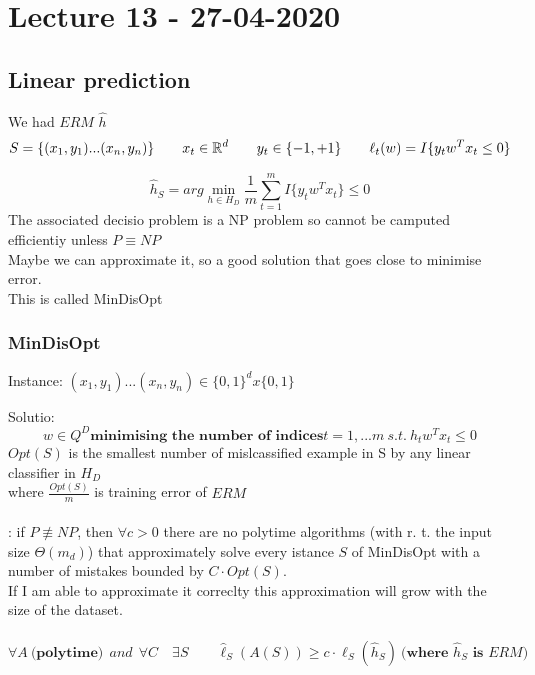 \documentclass[../main.tex]{subfiles}
\begin{document}
\chapter{Lecture 13 - 27-04-2020}

\section{Linear prediction}

We had $ERM$ $\hat{h}$
\\
$$
S = \{(x_1,y_1) ... (x_n,y_n) \} \qquad x_t \in \mathbb{R}^d \qquad y_t \in \{-1,+1\} \qquad \ell_t(w) = I \{ y_t w^T x_t \leq 0 \}
$$

$$
\hat{h}_S = arg \min_{h\in H_D} \frac{1}{m} \sum_{t = 1}^{m} I \{ y_t w^T x_t\} \leq 0 
$$
The associated decisio problem is a NP problem so cannot be camputed efficientiy unless $P \equiv NP$
\\
Maybe we can approximate it, so a good solution that goes close to minimise error.
\\
This is called MinDisOpt\\

\subsection{MinDisOpt}
Instance: $(x_1,y_1) ...(x_n, y_n) \in \{0, 1 \}^d x\{0,1\}$

Solutio: 
$$w \in Q^D \textbf{minimising the number of indices} t = 1,...m \ s.t. \
h_t w^Tx_t \leq 0 
$$
$Opt(S)$ is the smallest number of mislcassified example in S by any linear classifier in $H_D$ 
\\
where $\frac{Opt(S)}{m}$ is training error of $ERM$
\\\\
 : if $P \not \equiv NP$, then $\forall c > 0$ there are no polytime algorithms (with r. t. the input size $ \Theta(m_d)$) that approximately solve every istance $S$ of MinDisOpt with a number of mistakes bounded by $C \cdot Opt(S)$.\\
If I am able to approximate it correclty this approximation will grow with the size of the dataset.
\\\\
$$\forall A \ \textbf{(polytime)} \ \ and \ \ \forall C \quad \exists S \qquad \hat{\ell}_S\left(A\left(S\right)\right) \geq c \cdot \hat{\ell}_S\left( \hat{h}_S \right) \ \textbf{(where $\hat{h}_S$  is $ERM$)}
$$
\end{document}
